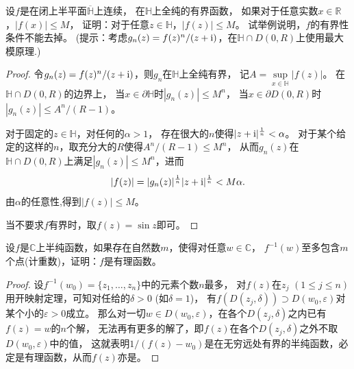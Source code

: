\begin{9}
    设$f$是在闭上半平面$\overline{\mathbb{H}}$上连续，
    在$\mathbb{H}$上全纯的有界函数，
    如果对于任意实数$x\in\mathbb{R}$，$|f(x)|\leq M$，
    证明：对于任意$z\in\mathbb{H}$，$|f(z)|\leq M$。
    试举例说明，$f$的有界性条件不能去掉。
    (提示：考虑$g_n(z)=f(z)^n/(z+{\rm i})$，在$\mathbb{H}\cap D(0,R)$上使用最大模原理.)
\end{9}
\begin{proof}
    令$g_n(z)=f(z)^n/(z+{\rm i})$，则$g_n$在$\mathbb{H}$上全纯有界，
    记$A=\sup\limits_{x\in\mathbb{H}}|f(z)|$。
    在$\mathbb{H}\cap D(0,R)$的边界上，
    当$x\in\partial\mathbb{H}$时$|g_n(z)|\leq M^n$，
    当$x\in\partial D(0,R)$时$|g_n(z)|\leq A^n/(R-1)$。

    对于固定的$z\in\mathbb{H}$，对任何的$\alpha>1$，
    存在很大的$n$使得$|z+{\rm i}|^{\frac{1}{n}}<\alpha$。
    对于某个给定的这样的$n$，取充分大的$R$使得$A^n/(R-1)\leq M^n$，
    从而$g_n(z)$在$\mathbb{H}\cap D(0,R)$上满足$|g_n(z)|\leq M^n$，进而
    \[|f(z)|=|g_n(z)|^\frac{1}{n}|z+{\rm i}|^{\frac{1}{n}}<M\alpha.\]
    由$\alpha$的任意性,得到$|f(z)|\leq M$。

    当不要求$f$有界时，取$f(z)=\sin z$即可。
\end{proof}

\begin{10}
    设$f$是$\mathbb{C}$上半纯函数，如果存在自然数$m$，使得对任意$w\in\mathbb{C}$，
    $f^{-1}(w)$至多包含$m$个点(计重数)，证明：$f$是有理函数。
\end{10}
\begin{proof}
    设$f^{-1}(w_0)=\{z_1,\dots,z_n\}$中的元素个数$n$最多，
    对$f(z)$在$z_j$ $(1 \le j \le n)$用开映射定理，可知对任给的$\delta>0$ (如$\delta=1$)，
    有$f(D(z_j,\delta)) \supset D(w_0,\varepsilon)$对某个小的$\varepsilon>0$成立。
    那么对一切$w \in D(w_0,\varepsilon)$，在各个$D(z_j,\delta)$之内已有$f(z)=w$的$n$个解，
    无法再有更多的解了，即$f(z)$在各个$D(z_j,\delta)$之外不取$D(w_0,\varepsilon)$中的值，
    这就表明$1/(f(z)-w_0)$是在无穷远处有界的半纯函数，必定是有理函数，从而$f(z)$亦是。
\end{proof}

